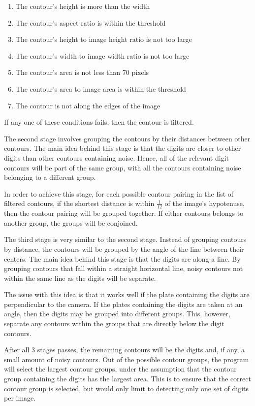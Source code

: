 \documentclass[a4paper, 10pt, titlepage]{article}
\begin{document}
\begin{enumerate}
    \item The contour's height is more than the width
    \item The contour's aspect ratio is within the threshold
    \item The contour's height to image height ratio is not too large
    \item The contour's width to image width ratio is not too large
    \item The contour's area is not less than 70 pixels
    \item The contour's area to image area is within the threshold
    \item The contour is not along the edges of the image
\end{enumerate}

If any one of these conditions fails, then the contour is filtered.

The second stage involves grouping the contours by their distances between
other contours. The main idea behind this stage is that the digits are closer
to other digits than other contours containing noise. Hence, all of the
relevant digit contours will be part of the same group, with all the contours
containing noise belonging to a different group.

In order to achieve this stage, for each possible contour pairing in the list
of filtered contours, if the shortest distance is within $\frac{1}{12}$ of the
image's hypotenuse, then the contour pairing will be grouped together. If
either contours belongs to another group, the groups will be conjoined.

The third stage is very similar to the second stage. Instead of grouping
contours by distance, the contours will be grouped by the angle of the line
between their centers. The main idea behind this stage is that the digits are
along a line. By grouping contours that fall within a straight horizontal line,
noisy contours not within the same line as the digits will be separate.

The issue with this idea is that it works well if the plate containing the
digits are perpendicular to the camera. If the plates containing the digits are
taken at an angle, then the digits may be grouped into different groups. This,
however, separate any contours within the groups that are directly below the
digit contours.

After all 3 stages passes, the remaining contours will be the digits and, if
any, a small amount of noisy contours. Out of the possible contour groups,
the program will select the largest contour groups, under the assumption that
the contour group containing the digits has the largest area. This is to ensure
that the correct contour group is selected, but would only limit to detecting
only one set of digits per image.
\end{document}
